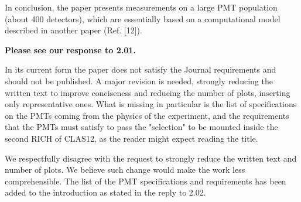 \documentclass[11pt]{report}
\begin{document}





\begin{tcolorbox}[enlarge top by=2em,colbacktitle=blue!60!white,colframe=black!80!white,left=0pt,right=0pt,top=0pt,bottom=0pt,boxrule=0.3pt,title=\bfseries2.10]
In conclusion, the paper presents measurements on a large PMT population (about 400 detectors), which are essentially based on a computational model described in another paper (Ref. [12]).
\end{tcolorbox}

{\bfseries Please see our response to 2.01.}


\begin{tcolorbox}[enlarge top by=2em,colbacktitle=blue!60!white,colframe=black!80!white,left=0pt,right=0pt,top=0pt,bottom=0pt,boxrule=0.3pt,title=\bfseries2.11]
In its current form the paper does not satisfy the Journal requirements and should not be published. A major revision is needed, strongly reducing the written text to improve conciseness and reducing the number of plots, inserting only representative ones. What is missing in particular is the list of specifications on the PMTs coming from the physics of the experiment, and the requirements that the PMTs must satisfy to pass the "selection" to be mounted inside the second RICH of CLAS12, as the reader might expect reading the title.
\end{tcolorbox}

We respectfully disagree with the request to strongly reduce the written text and number of plots.
We believe such change would make the work less comprehensible.
The list of the PMT specifications and requirements has been added to the introduction as stated in the reply to 2.02.
\end{document}
